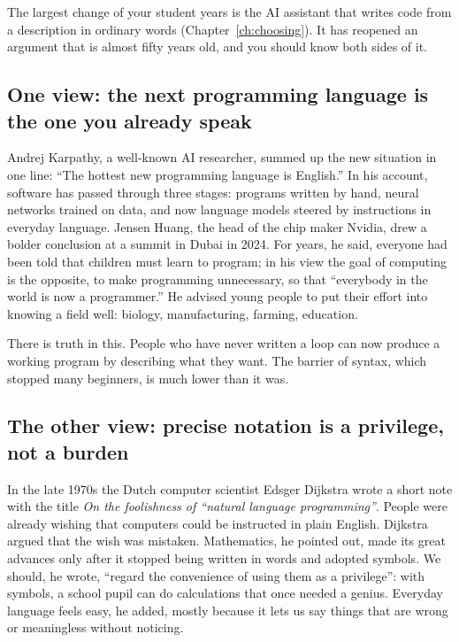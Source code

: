 The largest change of your student years is the AI assistant that writes code from a
description in ordinary words (Chapter~\ref{ch:choosing}). It has reopened an argument
that is almost fifty years old, and you should know both sides of it.

\subsection*{One view: the next programming language is the one you already speak}

Andrej Karpathy, a well-known AI researcher, summed up the new situation in one line:
``The hottest new programming language is English.'' In his account, software has passed
through three stages: programs written by hand, neural networks trained on data, and now
language models steered by instructions in everyday language. Jensen Huang, the head of
the chip maker Nvidia, drew a bolder conclusion at a summit in Dubai in 2024. For years,
he said, everyone had been told that children must learn to program; in his view the goal
of computing is the opposite, to make programming unnecessary, so that ``everybody in the
world is now a programmer.'' He advised young people to put their effort into knowing a
field well: biology, manufacturing, farming, education.

There is truth in this. People who have never written a loop can now produce a working
program by describing what they want. The barrier of syntax, which stopped many
beginners, is much lower than it was.

\subsection*{The other view: precise notation is a privilege, not a burden}

In the late 1970s the Dutch computer scientist Edsger Dijkstra wrote a short note with
the title \emph{On the foolishness of ``natural language programming''}. People were
already wishing that computers could be instructed in plain English. Dijkstra argued that
the wish was mistaken. Mathematics, he pointed out, made its great advances only after it
stopped being written in words and adopted symbols. We should, he wrote, ``regard the
convenience of using them as a privilege'': with symbols, a school pupil can do
calculations that once needed a genius. Everyday language feels easy, he added, mostly
because it lets us say things that are wrong or meaningless without noticing.

